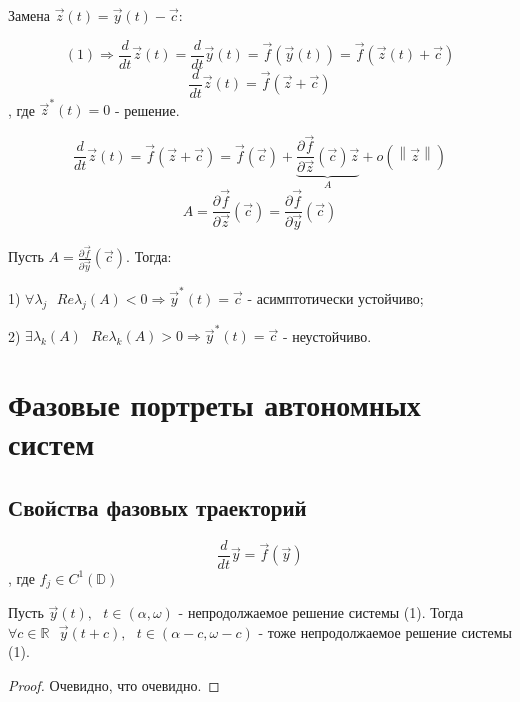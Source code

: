 \documentclass[12pt, a4paper]{report}
\begin{document}
Замена \( \vec{ z }  (t ) = \vec{ y}  (t ) - \vec{ c }   \): 

\[ (1 ) \Rightarrow \frac{d}{dt }  \vec{z }  (t ) = \frac{d}{dt }  \vec{ y}  (t ) = \vec{f }  (\vec{ y}  (t )) = \vec{f }  (\vec{z  } (t ) + \vec{ c } ) \]  
\[ \frac{d}{dt }  \vec{ z } (t ) = \vec{ f }  (\vec{ z}  + \vec{ c }  ) \] 
, где \( \vec{ z }  ^* (t ) = 0 \) - решение. 

\[ \frac{d}{dt }  \vec{ z }  (t ) = \vec{ f } (\vec{ z}  + \vec{ c}  ) = \vec{f } (\vec{c } ) + \underbrace{\frac{\partial  \vec{ f } }{\partial  \vec{ z } }(\vec{ c } ) \vec{ z } }_{A }    + o (\left\lVert  \vec{z }  \right\rVert)  \] 
\[ A = \frac{\partial  \vec{f } }{\partial  \vec{z } } (\vec{ c } ) = \frac{\partial  \vec{ f } }{\partial  \vec{ y } } (\vec{ c }  )   \] 

\begin{theorem}
    Пусть \( A = \displaystyle  \frac{\partial  \vec{ f } }{\partial  \vec{ y} }(\vec{ c } )  \). Тогда: 

    1) \( \forall  \lambda_j \text{ }  Re \lambda_j (A ) < 0 \Rightarrow \vec{ y}  ^* (t ) = \vec{ c }   \) - асимптотически устойчиво; 

    2) \(  \exists  \lambda_k (A ) \text{ }  Re \lambda_k (A ) >0 \Rightarrow \vec{ y}  ^* (t ) = \vec{ c } \) - неустойчиво.
\end{theorem}

\chapter{Фазовые портреты автономных систем}

\section{Свойства фазовых  траекторий }

\[ \frac{d}{dt }  \vec{ y}  = \vec{f }  (\vec{ y }  ) \tag{1 } \] 
, где \( f_j \in  C^1 (\mathbb{D}) \) 

\begin{lemma}
    Пусть \( \vec{ y}  (t ) , \text{ }   t \in  (\alpha , \omega ) \) - непродолжаемое решение системы (1). Тогда \( \forall  c \in  \mathbb{R}      \text{ }  \vec{ y}  (t + c ) , \text{ }  t \in  (\alpha - c , \omega  - c ) \) - тоже непродолжаемое решение системы (1).
\end{lemma}
\begin{proof}
Очевидно, что очевидно.
\end{proof}
\end{document}
